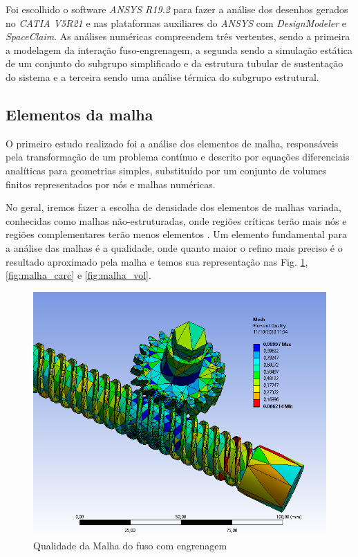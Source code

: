 Foi escolhido o software \textit{ANSYS R19.2} para fazer a análise dos desenhos gerados no \textit{CATIA V5R21} e nas plataformas auxiliares do \textit{ANSYS} com \textit{DesignModeler} e \textit{SpaceClaim}. As análises numéricas compreendem três vertentes, sendo a primeira a modelagem da interação fuso-engrenagem, a segunda sendo a simulação estática de um conjunto do subgrupo simplificado e da estrutura tubular de sustentação do sistema e a terceira sendo uma análise térmica do subgrupo estrutural.

\subsection{Elementos da malha}

O primeiro estudo realizado foi a análise dos elementos de malha, responsáveis pela transformação de um problema contínuo e descrito por equações diferenciais analíticas para geometrias simples, substituído por um conjunto de volumes finitos representados por nós e malhas numéricas. 

No geral, iremos fazer a escolha de densidade dos elementos de malhas variada, conhecidas como malhas não-estruturadas, onde regiões críticas terão mais nós e regiões complementares terão menos elementos \cite{malha}. Um elemento fundamental para a análise das malhas é a qualidade, onde quanto maior o refino mais preciso é o resultado aproximado pela malha e temos sua representação nas Fig. \ref{fig:Malha_eng}, \ref{fig:malha_carc} e \ref{fig:malha_vol}.

\begin{figure}[ht]
        \centering
        \includegraphics[width=.9\textwidth]{figuras/estrutura/InteracaoFusoEng/meshquality.png}
        \caption{Qualidade da Malha do fuso com engrenagem}
        \label{fig:Malha_eng}
    \end{figure}
    


